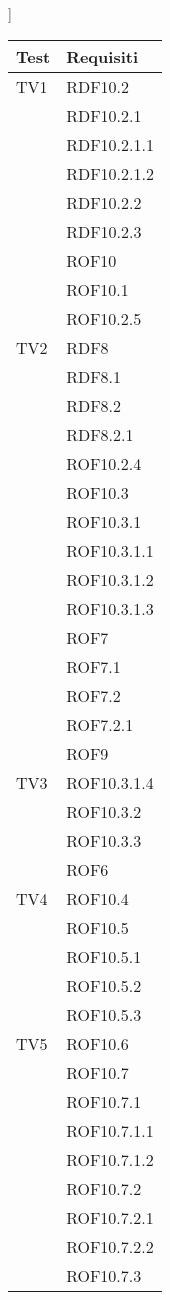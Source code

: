 ]

\begin{center}
\begin{longtable}{|p{7cm}|p{7cm}|}
\toprule
\textbf{Test} & \textbf{Requisiti}\\

\midrule
TV1
& RDF10.2\\
& RDF10.2.1\\
& RDF10.2.1.1\\
& RDF10.2.1.2\\
& RDF10.2.2\\
& RDF10.2.3\\
& ROF10\\
& ROF10.1\\
& ROF10.2.5\\

\midrule
TV2
& RDF8\\
& RDF8.1\\
& RDF8.2\\
& RDF8.2.1\\
& ROF10.2.4\\
& ROF10.3\\
& ROF10.3.1\\
& ROF10.3.1.1\\
& ROF10.3.1.2\\
& ROF10.3.1.3\\
& ROF7\\
& ROF7.1\\
& ROF7.2\\
& ROF7.2.1\\
& ROF9\\

\midrule
TV3
& ROF10.3.1.4\\
& ROF10.3.2\\
& ROF10.3.3\\
& ROF6\\

\midrule
TV4
& ROF10.4\\
& ROF10.5\\
& ROF10.5.1\\
& ROF10.5.2\\
& ROF10.5.3\\

\midrule
TV5
& ROF10.6\\
& ROF10.7\\
& ROF10.7.1\\
& ROF10.7.1.1\\
& ROF10.7.1.2\\
& ROF10.7.2\\
& ROF10.7.2.1\\
& ROF10.7.2.2\\
& ROF10.7.3\\


\end{longtable}
\end{center}
